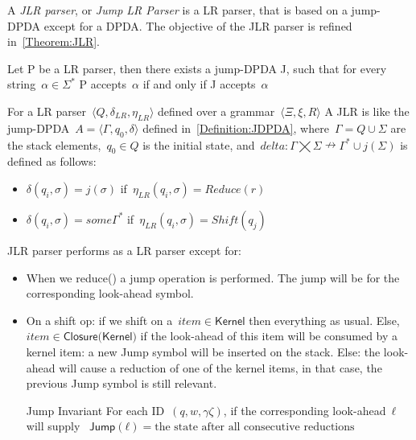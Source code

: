 A \emph{JLR parser}, or \emph{Jump LR Parser} is a LR parser, that 
  is based on a jump-DPDA except for a DPDA\@.
The objective of the JLR parser is refined in~\cref{Theorem:JLR}.
  
\begin{Theorem}
  \label{Theorem:JLR}
  Let P be a LR parser, then there exists a jump-DPDA J,
  such that for every string~$α∈Σ^*$
  P accepts~$α$ if and only if J accepts~$α$
\end{Theorem}

For a LR parser~$\langle Q , \delta_{LR} , η_{LR} \rangle$ defined over a grammar~$\langle \Xi , \xi , R \rangle$
A JLR is like the jump-DPDA~$A=⟨Γ,q_0,δ⟩$ defined in~\cref{Definition:JDPDA},
  where~$\Gamma = Q \cup \Sigma $ are the stack elements,~$q_0 \in Q$ is the initial state, and~$delta:Γ⨉Σ↛Γ^*∪j(\Sigma)$ is defined as follows:
  \begin{itemize}
   \item $\delta(q_i,\sigma)= j(\sigma)$ if~$\eta_{LR}(q_i,\sigma)=Reduce(r)$
   \item $\delta(q_i,\sigma)= some \Gamma^*$ if~$\eta_{LR}(q_i,\sigma)=Shift(q_j)$
  \end{itemize}


JLR parser performs as a LR parser except for:
\begin{itemize}
  \item When we \textsf{reduce()} a jump operation is performed.
    The jump will be for the corresponding look-ahead symbol.

  \item On a shift op:
  if we shift on a~$item∈\textsf{Kernel}$
    then everything as usual.
  Else,~$item∈\textsf{Closure(Kernel)}$
      if the look-ahead of this item will be consumed by a kernel item:
        a new Jump symbol will be inserted on the stack.
      Else:
        the look-ahead will cause a reduction of one of the kernel items,
        in that case, the previous Jump symbol is still relevant.
  \item[Jump Invariant] For each ID~$(q,w,γζ)$, if the corresponding look-ahead~$ℓ$ will supply
~$\textsf{Jump}(ℓ)= \text{the state after all consecutive reductions}$
\end{itemize}
